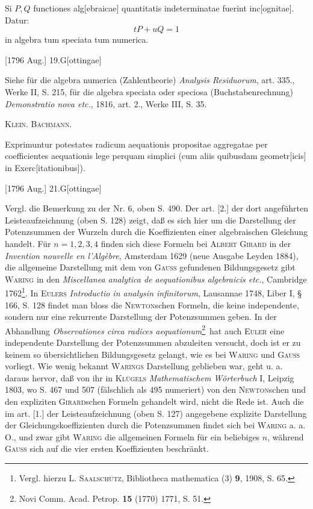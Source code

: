 \clearpage{}
\indent Si \(P,Q\) functiones alg[ebraicae] quantitatis indeterminatae fuerint inc[ognitae]. Datur:
\[
tP+uQ=1
\]
\noindent in algebra tum speciata tum numerica.
\par\noindent\hfill[1796 Aug.] 19.\quad G[ottingae]

\medskip\begingroup\small
\indent Siehe für die algebra numerica (Zahlentheorie) \textit{Analysis Residuorum}, art. 335., Werke II, S. 215, für die algebra speciata oder speciosa (Buchstabenrechnung) \textit{Demonstratio nova etc.}, 1816, art. 2., Werke III, S. 35.
\par\noindent\hfill\textsc{Klein. Bachmann.}
\par\endgroup

\indent Exprimuntur potestates radicum aequationis propositae aggregatae per coefficientes aequationis lege perquam simplici (cum aliis quibusdam geometr[icis] in Exerc[itationibus]).
\par\noindent\hfill[1796 Aug.] 21.\quad G[ottingae]

\medskip\begingroup\small
\indent Vergl. die Bemerkung zu der Nr. 6, oben S. 490. Der art. [2.] der dort angeführten Leisteaufzeichnung (oben S. 128) zeigt, daß es sich hier um die  Darstellung der Potenzsummen der Wurzeln durch die Koeffizienten einer algebraischen Gleichung handelt. Für \(n=1,2,3,4\) finden sich diese Formeln bei \textsc{Albert Girard} in der \textit{Invention nouvelle en l’Algèbre}, Amsterdam 1629 (neue Ausgabe Leyden 1884), die allgemeine Darstellung mit dem von \textsc{Gauss} gefundenen Bildungsgesetz gibt \textsc{Waring} in den \textit{Miscellanea analytica de aequationibus algebraicis etc.}, Cambridge 1762\footnote{Vergl. hierzu L. \textsc{Saalschütz}, Bibliotheca mathematica (3) \textbf{9}, 1908, S. 65.}. In \textsc{Eulers} \textit{Introductio in analysin infinitorum}, Lausannae 1748, Liber I, § 166, S. 128 findet man bloss die \textsc{Newton}schen Formeln, die keine independente, sondern nur eine rekurrente Darstellung der Potenzsummen geben. In der Abhandlung \textit{Observationes circa radices aequationum}\begingroup\renewcommand{\thefootnote}{**)}\footnote{Novi Comm. Acad. Petrop. \textbf{15} (1770) 1771, S. 51.}\endgroup\ hat auch \textsc{Euler} eine independente Darstellung der Potenzsummen abzuleiten versucht, doch ist er zu keinem so übersichtlichen Bildungsgesetz gelangt, wie es bei \textsc{Waring} und \textsc{Gauss} vorliegt. Wie wenig bekannt \textsc{Warings} Darstellung geblieben war, geht u. a. daraus hervor, daß von ihr in \textsc{Klügels} \textit{Mathematischem Wörterbuch} I, Leipzig 1803, wo S. 467 und 507 (fälschlich als 495 numeriert) von den \textsc{Newton}schen und den expliziten \textsc{Girard}schen Formeln gehandelt wird, nicht die Rede ist. Auch die im art. [1.] der Leisteaufzeichnung (oben S. 127) angegebene explizite Darstellung der Gleichungskoeffizienten durch die Potenzsummen findet sich bei \textsc{Waring} a. a. O., und zwar gibt \textsc{Waring} die allgemeinen Formeln für ein beliebiges \(n\), während \textsc{Gauss} sich auf die vier ersten Koeffizienten beschränkt.

